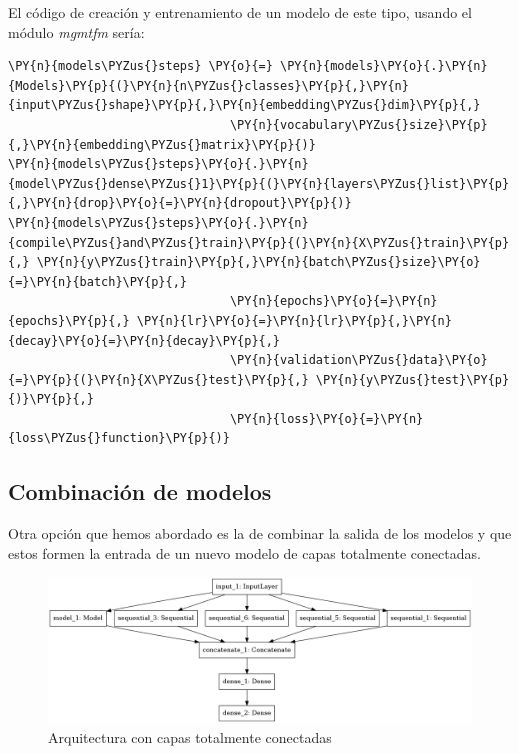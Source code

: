 El código de creación y entrenamiento de un modelo de este tipo, usando el módulo \textit{mgmtfm} sería: 

\vspace{0.5cm}



    \begin{tcolorbox}[breakable, size=fbox, boxrule=1pt, pad at break*=1mm,colback=cellbackground, colframe=cellborder]
\begin{Verbatim}[commandchars=\\\{\}]
\PY{n}{models\PYZus{}steps} \PY{o}{=} \PY{n}{models}\PY{o}{.}\PY{n}{Models}\PY{p}{(}\PY{n}{n\PYZus{}classes}\PY{p}{,}\PY{n}{input\PYZus{}shape}\PY{p}{,}\PY{n}{embedding\PYZus{}dim}\PY{p}{,}
                               \PY{n}{vocabulary\PYZus{}size}\PY{p}{,}\PY{n}{embedding\PYZus{}matrix}\PY{p}{)}
\PY{n}{models\PYZus{}steps}\PY{o}{.}\PY{n}{model\PYZus{}dense\PYZus{}1}\PY{p}{(}\PY{n}{layers\PYZus{}list}\PY{p}{,}\PY{n}{drop}\PY{o}{=}\PY{n}{dropout}\PY{p}{)}
\PY{n}{models\PYZus{}steps}\PY{o}{.}\PY{n}{compile\PYZus{}and\PYZus{}train}\PY{p}{(}\PY{n}{X\PYZus{}train}\PY{p}{,} \PY{n}{y\PYZus{}train}\PY{p}{,}\PY{n}{batch\PYZus{}size}\PY{o}{=}\PY{n}{batch}\PY{p}{,} 
                               \PY{n}{epochs}\PY{o}{=}\PY{n}{epochs}\PY{p}{,} \PY{n}{lr}\PY{o}{=}\PY{n}{lr}\PY{p}{,}\PY{n}{decay}\PY{o}{=}\PY{n}{decay}\PY{p}{,} 
                               \PY{n}{validation\PYZus{}data}\PY{o}{=}\PY{p}{(}\PY{n}{X\PYZus{}test}\PY{p}{,} \PY{n}{y\PYZus{}test}\PY{p}{)}\PY{p}{,}
                               \PY{n}{loss}\PY{o}{=}\PY{n}{loss\PYZus{}function}\PY{p}{)} 
\end{Verbatim}
\end{tcolorbox}




\subsection{Combinación de modelos}
\label{section:super:mod:stack}

Otra opción que hemos abordado es la de combinar la salida de los modelos y que estos formen la entrada de un nuevo modelo de capas totalmente conectadas. 


\begin{figure}[!ht]
	\centering
	\includegraphics[width=1\textwidth]{images/super/arq_stack}
	\caption{Arquitectura con capas totalmente conectadas}
	\label{fig:arqstack}
\end{figure}


